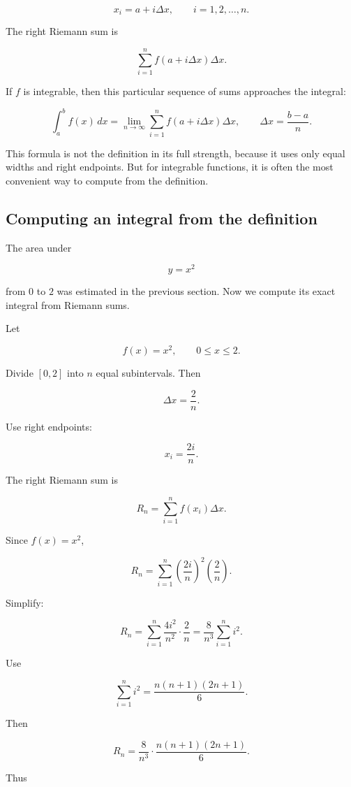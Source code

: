 \[
x_i=a+i\Delta x,
\qquad i=1,2,\ldots,n.
\]

The right Riemann sum is

\[
\sum_{i=1}^{n} f(a+i\Delta x)\Delta x.
\]

If \(f\) is integrable, then this particular sequence of sums approaches the integral:

\[
\boxed{
\int_a^b f(x)\,dx
=
\lim_{n\to\infty}
\sum_{i=1}^{n} f(a+i\Delta x)\Delta x,
\qquad
\Delta x=\frac{b-a}{n}.
}
\]

This formula is not the definition in its full strength, because it uses only equal
widths and right endpoints.  But for integrable functions, it is often the most convenient
way to compute from the definition.

\subsection{Computing an integral from the definition}
\label{subsec:computing-integral-definition}

The area under

\[
y=x^2
\]

from \(0\) to \(2\) was estimated in the previous section.  Now we compute its exact
integral from Riemann sums.

Let

\[
f(x)=x^2,
\qquad
0\le x\le2.
\]

Divide \([0,2]\) into \(n\) equal subintervals.  Then

\[
\Delta x=\frac{2}{n}.
\]

Use right endpoints:

\[
x_i=\frac{2i}{n}.
\]

The right Riemann sum is

\[
R_n
=
\sum_{i=1}^{n}
f(x_i)\Delta x.
\]

Since \(f(x)=x^2\),

\[
R_n
=
\sum_{i=1}^{n}
\left(\frac{2i}{n}\right)^2
\left(\frac{2}{n}\right).
\]

Simplify:

\[
R_n
=
\sum_{i=1}^{n}
\frac{4i^2}{n^2}\cdot\frac{2}{n}
=
\frac{8}{n^3}\sum_{i=1}^{n}i^2.
\]

Use

\[
\sum_{i=1}^{n}i^2
=
\frac{n(n+1)(2n+1)}{6}.
\]

Then

\[
R_n
=
\frac{8}{n^3}\cdot\frac{n(n+1)(2n+1)}{6}.
\]

Thus

